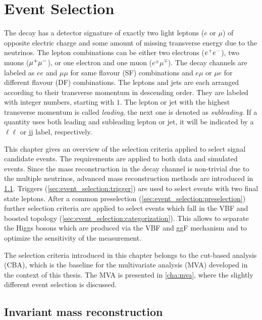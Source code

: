 \chapter{Event Selection}\label{cha:event_selection}

The \Httllfull{} decay has a detector signature of exactly two light leptons ($e$ or $\mu$) of opposite electric
charge and some amount of missing transverse energy due to the neutrinos.
The lepton combinations can be either two electrons ($e^+e^-$), two muons ($\mu^+\mu^-$), or one electron and one muon ($e^\pm \mu^\mp$).
The decay channels are labeled as $ee$ and $\mu\mu$ for same flavour (SF) combinations and $e\mu$ or $\mu e$ for
different flavour (DF) combinations.
The leptons and jets are each arranged according to their transverse momentum in descending order.
They are labeled with integer numbers, starting with $1$.
The lepton or jet with the highest transverse momentum is called \emph{leading},
the next one is denoted as \emph{subleading}.
If a quantity uses both leading and subleading lepton or jet, it will be indicated by a $\ell\ell$ or jj label, respectively.

This chapter gives an overview of the selection criteria applied to select signal candidate events.
The requirements are applied to both data and simulated events.
Since the mass reconstruction in the \Httllfull{} decay channel is non-trivial due to the multiple neutrinos,
advanced mass reconstruction methods are introduced in \cref{sec:event_selection:mass}.
Triggers (\cref{sec:event_selection:trigger}) are used to select events with two final state leptons.
After a common preselection (\cref{sec:event_selection:preselection}) further selection criteria are applied
to select events which fall in the VBF and boosted topology (\cref{sec:event_selection:categorization}).
This allows to separate the Higgs bosons which are produced via the VBF and ggF mechanism and to optimize the sensitivity of the measurement.

The selection criteria introduced in this chapter belongs to the cut-based analysis (CBA), which is the baseline
for the multivariate analysis (MVA) developed in the context of this thesis.
The MVA is presented in \cref{cha:mva}, where the slightly different event selection is discussed.

\section{Invariant mass reconstruction}\label{sec:event_selection:mass}

